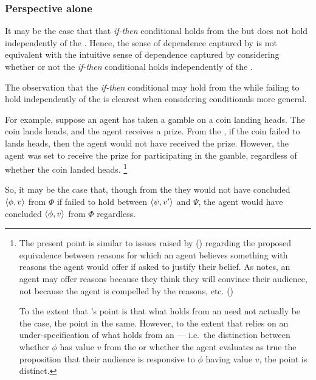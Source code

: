 \subsubsection{Perspective alone}

\begin{note}
  It may be the case that that \emph{if-then} conditional holds from the \agpe{} but does not hold independently of the \agpe{}.
  Hence, the sense of dependence captured by \qWhyV{} is not equivalent with the intuitive sense of dependence captured by considering whether or not the \emph{if-then} conditional holds independently of the \agpe{}.

  The observation that the \emph{if-then} conditional may hold from the \agpe{} while failing to hold independently of the \agpe{} is clearest when considering conditionals more general.

  For example, suppose an agent has taken a gamble on a coin landing heads.
  The coin lands heads, and the agent receives a prize.
  From the \agpe{}, if the coin failed to lands heads, then the agent would not have received the prize.
  However, the agent was set to receive the prize for participating in the gamble, regardless of whether the coin landed heads.%
  \footnote{
    The present point is similar to issues raised by \citeauthor{Harman:1973ww} (\citeyear{Harman:1973ww}) regarding the proposed equivalence between reasons for which an agent believes something with reasons the agent would offer if asked to justify their belief.
  As \citeauthor{Harman:1973ww} notes, an agent may offer reasons because they think they will convince their audience, not because the agent is compelled by the reasons, etc.
  (\citeyear[Ch.2]{Harman:1973ww})

  To the extent that \citeauthor{Harman:1973ww}'s point is that what holds from an \agpe{} need not actually be the case, the point in the same.
  However, to the extent that \citeauthor{Harman:1973ww} relies on an under-specification of what holds from an \agpe{} --- i.e.\ the distinction between whether \(\phi\) has value \(v\) from the \agpe{} or whether the agent evaluates as true the proposition that their audience is responsive to \(\phi\) having value \(v\), the point is distinct.
  }

  So, it may be the case that, though from the \agpe{} they would not have concluded \(\langle \phi, v \rangle\) from \(\Phi\) if \support{} failed to hold between \(\langle \psi, v' \rangle\) and \(\Psi\), the agent would have concluded \(\langle \phi, v \rangle\) from \(\Phi\) regardless.
\end{note}

